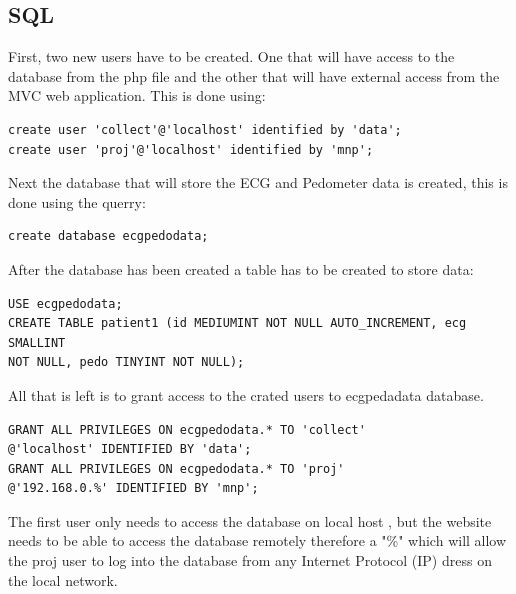 \documentclass[12pt,]{article}
\numberwithin{figure}{section}
\begin{document}
\subsection{SQL}
First, two new users have to be created. One that will have access to the database from the php file and the other that will have external access from the MVC web application. This is done using: 
\begin{verbatim}
create user 'collect'@'localhost' identified by 'data';
create user 'proj'@'localhost' identified by 'mnp';
\end{verbatim} 
Next the database that will store the ECG and Pedometer data is created, this is done using the querry: 
\begin{verbatim}
create database ecgpedodata;
\end{verbatim}
After the database has been created a table has to be created to store data:
\begin{verbatim}
USE ecgpedodata;
CREATE TABLE patient1 (id MEDIUMINT NOT NULL AUTO_INCREMENT, ecg SMALLINT 
NOT NULL, pedo TINYINT NOT NULL);
\end{verbatim}
All that is left is to grant access to the crated users to ecgpedadata database.
\begin{verbatim}
GRANT ALL PRIVILEGES ON ecgpedodata.* TO 'collect'
@'localhost' IDENTIFIED BY 'data';
GRANT ALL PRIVILEGES ON ecgpedodata.* TO 'proj'
@'192.168.0.%' IDENTIFIED BY 'mnp';
\end{verbatim}
The first user only needs to access the database on local host , but the website needs to be able to access the database remotely therefore a "\%" which will allow the proj user to log into the database from any Internet Protocol (IP) dress on the local network.
\end{document}
